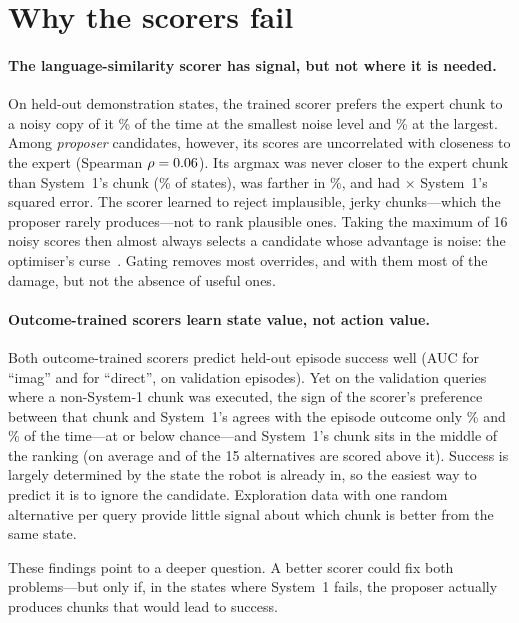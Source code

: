 \documentclass[11pt]{article}
\begin{document}
\section{Why the scorers fail}
\label{sec:why}

\paragraph{The language-similarity scorer has signal, but not where it is needed.} On \diagN{} held-out demonstration states, the trained scorer prefers the expert chunk to a noisy copy of it \diagPairLow\% of the time at the smallest noise level and \diagPairHigh\% at the largest. Among \emph{proposer} candidates, however, its scores are uncorrelated with closeness to the expert (Spearman $\rho=0.06$). Its argmax was never closer to the expert chunk than System~1's chunk (\diagCloser\% of states), was farther in \diagFarther\%, and had \diagMseRatio$\times$ System~1's squared error. The scorer learned to reject implausible, jerky chunks---which the proposer rarely produces---not to rank plausible ones. Taking the maximum of 16 noisy scores then almost always selects a candidate whose advantage is noise: the optimiser's curse~\citep{smith2006optimizer}. Gating removes most overrides, and with them most of the damage, but not the absence of useful ones.

\paragraph{Outcome-trained scorers learn state value, not action value.} Both outcome-trained scorers predict held-out episode success well (AUC \aucImag{} for ``imag'' and \aucDirect{} for ``direct'', on \valEpisodes{} validation episodes). Yet on the validation queries where a non-System-1 chunk was executed, the sign of the scorer's preference between that chunk and System~1's agrees with the episode outcome only \rankImag\% and \rankDirect\% of the time---at or below chance---and System~1's chunk sits in the middle of the ranking (on average \sOneRankImag{} and \sOneRankDirect{} of the 15 alternatives are scored above it). Success is largely determined by the state the robot is already in, so the easiest way to predict it is to ignore the candidate. Exploration data with one random alternative per query provide little signal about which chunk is better from the same state.

These findings point to a deeper question. A better scorer could fix both problems---but only if, in the states where System~1 fails, the proposer actually produces chunks that would lead to success.
\end{document}
